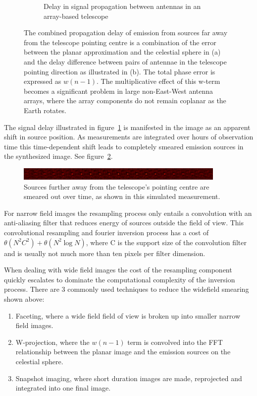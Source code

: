 \documentclass[a4paper,10pt]{article}
\begin{document}
\begin{figure}[h!]
\begin{subfigure}[b]{0.45\textwidth}
    \caption{Delay in signal propagation between antennas in an array-based telescope}
  \end{subfigure}
  \caption[Widefield phase delay]{The combined propagation delay of emission from sources far away from the telescope pointing centre is a combination
  of the error between the planar approximation and the celestial sphere in (a) and the delay difference between pairs of antennae in the telescope
  pointing direction as illustrated in (b). The total phase error is expressed as $w(n-1)$. The multiplicative effect of this w-term becomes a
  significant problem in large non-East-West antenna arrays, where the array components do not remain coplanar as the Earth rotates.}
  \label{FIG_WIDEFIELD_ERROR}
\end{figure}

The signal delay illustrated in figure~\ref{FIG_WIDEFIELD_ERROR} is manifested in the image as an apparent shift 
in source position. As measurements are integrated over hours of observation time this time-dependent shift leads to completely
smeared emission sources in the synthesized image. See figure~\ref{FIG_SMEARING}.
\begin{figure}[h!]
 \centering
 \includegraphics[width=0.9\textwidth]{images/distortions.png}
 \caption[Wide field distortions]{Sources further away from the telescope's pointing centre are smeared out over time, as
 shown in this simulated measurement.}
 \label{FIG_SMEARING}
\end{figure}

For narrow field images the resampling process only entails a convolution with an anti-aliasing filter that reduces energy of 
sources outside the field of view. This convolutional resampling and fourier inversion process has a cost of 
$\theta(N^2C^2) + \theta(N^2\log{N})$, where C is the support size of the convolution filter and is usually not much more 
than ten pixels per filter dimension.

When dealing with wide field images the cost of the resampling component quickly escalates to dominate the computational
complexity of the inversion process. There are 3 commonly used techniques to reduce the widefield smearing shown above:
\begin{enumerate}
 \item Faceting, where a wide field field of view is broken up into smaller narrow field images.
 \item W-projection, where the $w(n-1)$ term is convolved into the FFT relationship between the planar image and the emission sources
 on the celestial sphere.
 \item Snapshot imaging, where short duration images are made, reprojected and integrated into one final image.
\end{enumerate}
\end{document}

